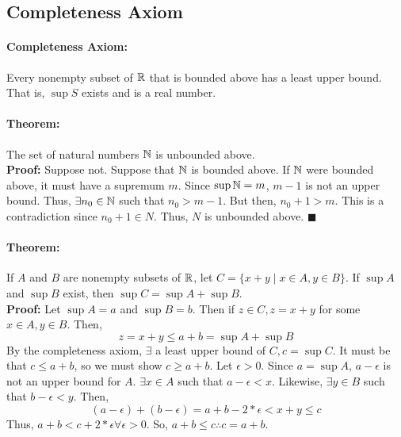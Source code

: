 \subsection{Completeness Axiom}
\paragraph{Completeness Axiom:} Every nonempty subset of $\mathbb{R}$ that is bounded above has a least upper bound. That is, $\sup S$ exists and is a real number.

\paragraph{Theorem:} The set of natural numbers $\mathbb{N}$ is unbounded above. \\
\textbf{Proof:} Suppose not. Suppose that $\mathbb{N}$ is bounded above. If $\mathbb{N}$ were bounded above, it must have a supremum $m$. Since $\sup \mathbb{N} = m$, $m - 1$ is not an upper bound. Thus, $\exists n_0 \in \mathbb{N}$ such that $n_0 > m - 1$. But then, $n_0 + 1 > m$. This is a contradiction since $n_0 + 1 \in N$. Thus, $N$ is unbounded above. $\blacksquare$

\paragraph{Theorem:} If $A$ and $B$ are nonempty subsets of $\mathbb{R}$, let $C = \{x + y \mid x \in A, y \in B\}$. If $\sup A$ and $\sup B$ exist, then $\sup C = \sup A + \sup B$. \\
\textbf{Proof:} Let $\sup A = a$ and $\sup B = b$. Then if $z \in C, z = x + y$ for some $x \in A, y \in B$. Then,
$$ z = x + y \leq a + b = \sup A + \sup B $$
By the completeness axiom, $\exists$ a least upper bound of $C, c = \sup C$. It must be that $c \leq a + b$, so we must show $c \geq a + b$. Let $\epsilon > 0$. Since $a = \sup A$, $a - \epsilon$ is not an upper bound for $A$. $\exists x \in A$ such that $a - \epsilon < x$. Likewise, $\exists y \in B$ such that $b - \epsilon < y$. Then,
$$ (a - \epsilon) + (b - \epsilon) = a + b - 2 * \epsilon < x + y \leq c $$
Thus, $a + b < c + 2 * \epsilon \forall \epsilon > 0$. So, $a + b \leq c \therefore c = a + b$.